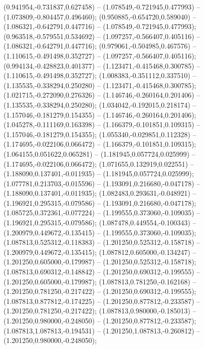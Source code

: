  (0.941954,-0.731837,0.627458) -- (1.078549,-0.721945,0.477993) -- (1.073809,-0.804457,0.496460);
 (0.950885,-0.654720,0.589040) -- (1.086321,-0.642791,0.447716) -- (1.078549,-0.721945,0.477993);
 (0.963518,-0.579551,0.534692) -- (1.097257,-0.566407,0.405116) -- (1.086321,-0.642791,0.447716);
 (0.979061,-0.504985,0.467576) -- (1.110615,-0.491498,0.352727) -- (1.097257,-0.566407,0.405116);
 (0.994134,-0.428823,0.401377) -- (1.123471,-0.415468,0.300785) -- (1.110615,-0.491498,0.352727);
 (1.008383,-0.351112,0.337510) -- (1.135535,-0.338294,0.250280) -- (1.123471,-0.415468,0.300785);
 (1.021715,-0.272090,0.276326) -- (1.146746,-0.260164,0.201406) -- (1.135535,-0.338294,0.250280);
 (1.034042,-0.192015,0.218174) -- (1.157046,-0.181279,0.154355) -- (1.146746,-0.260164,0.201406);
 (1.045278,-0.111169,0.163398) -- (1.166379,-0.101851,0.109315) -- (1.157046,-0.181279,0.154355);
 (1.055340,-0.029851,0.112328) -- (1.174695,-0.022106,0.066472) -- (1.166379,-0.101851,0.109315);
 (1.064155,0.051622,0.065281) -- (1.181945,0.057724,0.025999) -- (1.174695,-0.022106,0.066472);
 (1.071655,0.132919,0.022551) -- (1.188090,0.137401,-0.011935) -- (1.181945,0.057724,0.025999);
 (1.077781,0.213703,-0.015596) -- (1.193091,0.216680,-0.047178) -- (1.188090,0.137401,-0.011935);
 (1.082483,0.293631,-0.048921) -- (1.196921,0.295315,-0.079586) -- (1.193091,0.216680,-0.047178);
 (1.085725,0.372361,-0.077224) -- (1.199555,0.373060,-0.109035) -- (1.196921,0.295315,-0.079586);
 (1.087478,0.449554,-0.100343) -- (1.200979,0.449672,-0.135415) -- (1.199555,0.373060,-0.109035);
 (1.087813,0.525312,-0.118383) -- (1.201250,0.525312,-0.158718) -- (1.200979,0.449672,-0.135415);
 (1.087812,0.605000,-0.134247) -- (1.201250,0.605000,-0.179987) -- (1.201250,0.525312,-0.158718);
 (1.087813,0.690312,-0.148842) -- (1.201250,0.690312,-0.199555) -- (1.201250,0.605000,-0.179987);
 (1.087813,0.781250,-0.162168) -- (1.201250,0.781250,-0.217422) -- (1.201250,0.690312,-0.199555);
 (1.087813,0.877812,-0.174225) -- (1.201250,0.877812,-0.233587) -- (1.201250,0.781250,-0.217422);
 (1.087813,0.980000,-0.185013) -- (1.201250,0.980000,-0.248050) -- (1.201250,0.877812,-0.233587);
 (1.087813,1.087813,-0.194531) -- (1.201250,1.087813,-0.260812) -- (1.201250,0.980000,-0.248050);
